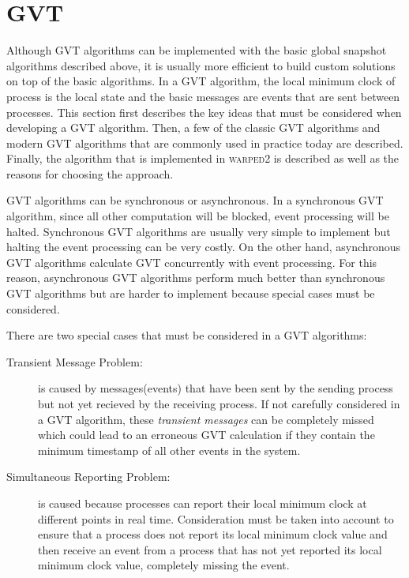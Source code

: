 \documentclass[11pt]{book}
\begin{document}
\section{GVT}

Although GVT algorithms can be implemented with the basic global snapshot algorithms described
above, it is usually more efficient to build custom solutions on top of the basic algorithms.
In a GVT algorithm, the local minimum clock of process is the local state and the basic
messages are events that are sent between processes.  This section first describes the key
ideas that must be considered when developing a GVT algorithm.  Then, a few of the classic
GVT algorithms and modern GVT algorithms that are commonly used in practice today are described.
Finally, the algorithm that is implemented in \textsc{warped2} is described as well as the
reasons for choosing the approach.

GVT algorithms can be synchronous or asynchronous.  In a synchronous GVT algorithm, since
all other computation will be blocked, event processing will be halted.  Synchronous GVT
algorithms are usually very simple to implement but halting the event processing can
be very costly.  On the other hand, asynchronous GVT algorithms calculate GVT concurrently
with event processing.  For this reason, asynchronous GVT algorithms perform much better
than synchronous GVT algorithms but are harder to implement because special cases must be
considered.

There are two special cases that must be considered in a GVT algorithms:

\begin{description}
    \item[Transient Message Problem:] is caused by messages(events) that have been sent by
    the sending process but not yet recieved by the receiving process.  If not carefully
    considered in a GVT algorithm, these \emph{transient messages} can be completely missed
    which could lead to an erroneous GVT calculation if they contain the minimum timestamp
    of all other events in the system.
    \item[Simultaneous Reporting Problem:] is caused because processes can report their local
    minimum clock at different points in real time.  Consideration must be taken into account
    to ensure that a process does not report its local minimum clock value and then receive
    an event from a process that has not yet reported its local minimum clock value,
    completely missing the event.
\end{description}
\end{document}

